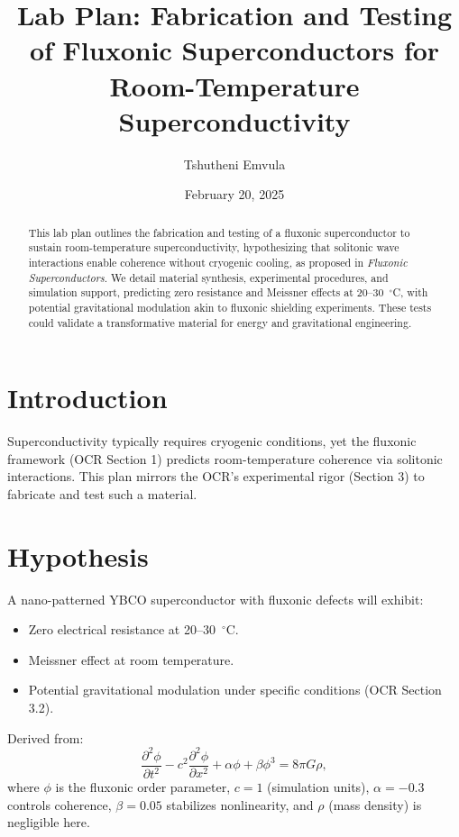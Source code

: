 \documentclass[a4paper,12pt]{article}
\title{Lab Plan: Fabrication and Testing of Fluxonic Superconductors for Room-Temperature Superconductivity}
\author{Tshutheni Emvula}
\date{February 20, 2025}
\begin{document}
\maketitle

\begin{abstract}
This lab plan outlines the fabrication and testing of a fluxonic superconductor to sustain room-temperature superconductivity, hypothesizing that solitonic wave interactions enable coherence without cryogenic cooling, as proposed in \emph{Fluxonic Superconductors}. We detail material synthesis, experimental procedures, and simulation support, predicting zero resistance and Meissner effects at 20--30~$^\circ$C, with potential gravitational modulation akin to fluxonic shielding experiments. These tests could validate a transformative material for energy and gravitational engineering.
\end{abstract}

\section{Introduction}
Superconductivity typically requires cryogenic conditions, yet the fluxonic framework (OCR Section 1) predicts room-temperature coherence via solitonic interactions. This plan mirrors the OCR’s experimental rigor (Section 3) to fabricate and test such a material.

\section{Hypothesis}
A nano-patterned YBCO superconductor with fluxonic defects will exhibit:
\begin{itemize}
    \item Zero electrical resistance at 20--30~$^\circ$C.
    \item Meissner effect at room temperature.
    \item Potential gravitational modulation under specific conditions (OCR Section 3.2).
\end{itemize}
Derived from:
\begin{equation}
\frac{\partial^2 \phi}{\partial t^2} - c^2 \frac{\partial^2 \phi}{\partial x^2} + \alpha \phi + \beta \phi^3 = 8 \pi G \rho,
\end{equation}
where \(\phi\) is the fluxonic order parameter, \(c = 1\) (simulation units), \(\alpha = -0.3\) controls coherence, \(\beta = 0.05\) stabilizes nonlinearity, and \(\rho\) (mass density) is negligible here.
\end{document}
